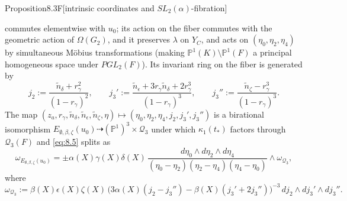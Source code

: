\documentclass[12pt,letterpaper]{amsart}
\theoremstyle{plain}
\theoremstyle{definition}
\theoremstyle{remark}
\theoremstyle{definition}
\begin{document}
\begin{res}{Proposition}{8.3F}[intrinsic coordinates and $SL_2(\alpha)$-fibration]
\begin{enumerate}[{\upshape(a)}]
commutes elementwise with $u_0$; its action on the fiber commutes with the
geometric action of $\Omega(G_2)$, and it preserves $\lambda$ on
$Y_C$, and acts on $(\eta_0,\eta_2,\eta_4)$ by simultaneous M\"obius
transformations (making $\mathbb{P}^1(K)\setminus\mathbb{P}^1(F)$ a principal
homogeneous space under $PGL_2(F)$). Its invariant ring on the fiber is
generated by
\begin{equation}\tag{8.7e}\label{eq:8.7e}
j_2:=\frac{\tilde n_\delta+r_\gamma^2}{(1-r_\gamma)^2},\qquad
j_3':=\frac{\tilde n_\epsilon+3r_\gamma\tilde n_\delta+2r_\gamma^3}{(1-r_\gamma)^3},\qquad
j_3'':=\frac{\tilde n_\zeta-r_\gamma^3}{(1-r_\gamma)^3}.
\end{equation}
The map $(z_a,r_\gamma,\tilde n_\delta,\tilde n_\epsilon,\tilde n_\zeta,\eta)\mapsto
(\eta_0,\eta_2,\eta_4,j_2,j_3',j_3'')$ is a birational isomorphism
$E_{\emptyset,\beta,\zeta}(u_0)\dashrightarrow(\mathbb{P}^1)^3\times\mathcal Q_3$
under which $\kappa_1(t_*)$ factors through $\mathcal Q_3(F)$ and \eqref{eq:8.5}
splits as
\begin{equation}\tag{8.7f}\label{eq:8.7f}
\omega_{E_{\emptyset,\beta,\zeta}(u_0)}
=\pm\alpha(X)\gamma(X)\delta(X)\,
\frac{d\eta_0\wedge d\eta_2\wedge d\eta_4}{(\eta_0-\eta_2)(\eta_2-\eta_4)(\eta_4-\eta_0)}
\wedge\omega_{\mathcal Q_3},
\end{equation}
where
\[
\omega_{\mathcal Q_3}:=\beta(X)\epsilon(X)\zeta(X)\,
\bigl(3\alpha(X)(j_2-j_3'')-\beta(X)(j_3'+2j_3'')\bigr)^{-3}\,
dj_2\wedge dj_3'\wedge dj_3''.
\]
\end{enumerate}
\end{res}
\end{document}

